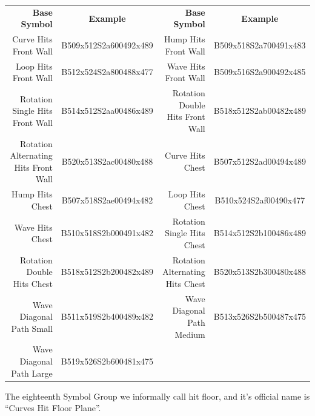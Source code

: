 \documentclass{article}
\begin{document}
\begin{center}
\begin{tabular}{rcrc}
\textbf{Base Symbol}&\textbf{Example}&\textbf{Base Symbol}&\textbf{Example}\\
Curve Hits Front Wall               &B509x512S2a600492x489&Hump Hits Front Wall           &B509x518S2a700491x483\\
Loop Hits Front Wall                &B512x524S2a800488x477&Wave Hits Front Wall           &B509x516S2a900492x485\\
Rotation Single Hits Front Wall     &B514x512S2aa00486x489&Rotation Double Hits Front Wall&B518x512S2ab00482x489\\
Rotation Alternating Hits Front Wall&B520x513S2ac00480x488&Curve Hits Chest               &B507x512S2ad00494x489\\
Hump Hits Chest                     &B507x518S2ae00494x482&Loop Hits Chest                &B510x524S2af00490x477\\
Wave Hits Chest                     &B510x518S2b000491x482&Rotation Single Hits Chest     &B514x512S2b100486x489\\
Rotation Double Hits Chest          &B518x512S2b200482x489&Rotation Alternating Hits Chest&B520x513S2b300480x488\\
Wave Diagonal Path Small            &B511x519S2b400489x482&Wave Diagonal Path Medium      &B513x526S2b500487x475\\
Wave Diagonal Path Large            &B519x526S2b600481x475\\
\end{tabular}
\end{center}

The eighteenth Symbol Group we informally call hit floor, and it's official name is ``Curves Hit Floor Plane''.
\end{document}
